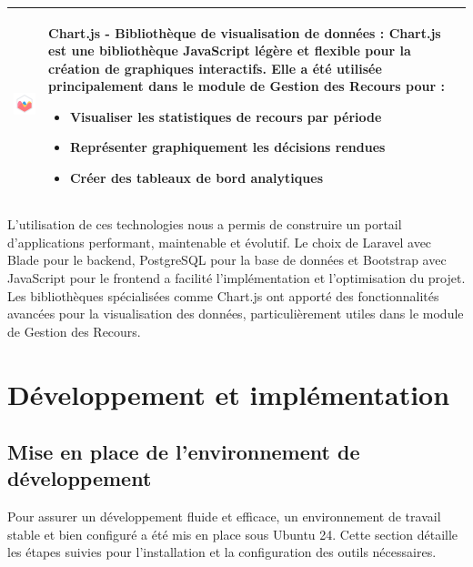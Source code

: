 \begin{longtable}{|m{4cm}|m{10cm}|}
    \includegraphics[width=3cm]{images/logo/chartjs.png} & 
    \textbf{Chart.js - Bibliothèque de visualisation de données} : Chart.js est une bibliothèque JavaScript légère et flexible pour la création de graphiques interactifs. Elle a été utilisée principalement dans le module de Gestion des Recours pour :  
    \begin{itemize}
        \item Visualiser les statistiques de recours par période
        \item Représenter graphiquement les décisions rendues
        \item Créer des tableaux de bord analytiques
    \end{itemize}\\
    \hline

 

\end{longtable}
\begin{center}  
    \label{tab:table_techs_realisation} %
\end{center}  

L'utilisation de ces technologies nous a permis de construire un portail d'applications performant, maintenable et évolutif. Le choix de Laravel avec Blade pour le backend, PostgreSQL pour la base de données et Bootstrap avec JavaScript pour le frontend a facilité l'implémentation et l'optimisation du projet. Les bibliothèques spécialisées comme Chart.js ont apporté des fonctionnalités avancées pour la visualisation des données, particulièrement utiles dans le module de Gestion des Recours.

\section{Développement et implémentation}

\subsection{Mise en place de l'environnement de développement}
Pour assurer un développement fluide et efficace, un environnement de travail stable et bien configuré a été mis en place sous Ubuntu 24. Cette section détaille les étapes suivies pour l'installation et la configuration des outils nécessaires.

